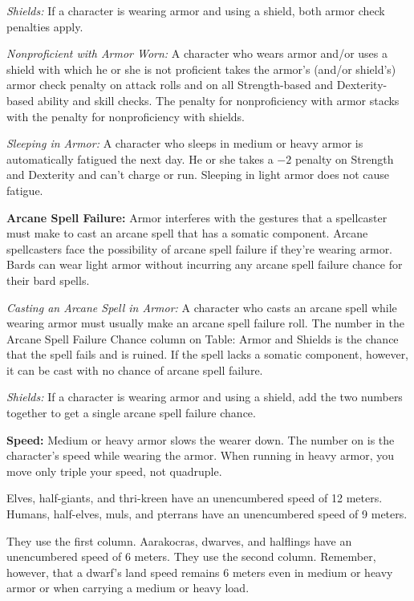 \textit{Shields:} If a character is wearing armor and using a shield, both armor check penalties apply.

\textit{Nonproficient with Armor Worn:} A character who wears armor and/or uses a shield with which he or she is not proficient takes the armor's (and/or shield's) armor check penalty on attack rolls and on all Strength-based and Dexterity-based ability and skill checks. The penalty for nonproficiency with armor stacks with the penalty for nonproficiency with shields.

\textit{Sleeping in Armor:} A character who sleeps in medium or heavy armor is automatically fatigued the next day. He or she takes a $-2$ penalty on Strength and Dexterity and can't charge or run. Sleeping in light armor does not cause fatigue.

\textbf{Arcane Spell Failure:} Armor interferes with the gestures that a spellcaster must make to cast an arcane spell that has a somatic component. Arcane spellcasters face the possibility of arcane spell failure if they're wearing armor. Bards can wear light armor without incurring any arcane spell failure chance for their bard spells.

\textit{Casting an Arcane Spell in Armor:} A character who casts an arcane spell while wearing armor must usually make an arcane spell failure roll. The number in the Arcane Spell Failure Chance column on Table: Armor and Shields is the chance that the spell fails and is ruined. If the spell lacks a somatic component, however, it can be cast with no chance of arcane spell failure.

\textit{Shields:} If a character is wearing armor and using a shield, add the two numbers together to get a single arcane spell failure chance.

\textbf{Speed:} Medium or heavy armor slows the wearer down. The number on  is the character's speed while wearing the armor. When running in heavy armor, you move only triple your speed, not quadruple.

Elves, half-giants, and thri-kreen have an unencumbered speed of 12 meters. Humans, half-elves, muls, and pterrans have an unencumbered speed of 9 meters.

They use the first column. Aarakocras, dwarves, and halflings have an unencumbered speed of 6 meters. They use the second column. Remember, however, that a dwarf's land speed remains 6 meters even in medium or heavy armor or when carrying a medium or heavy load.

